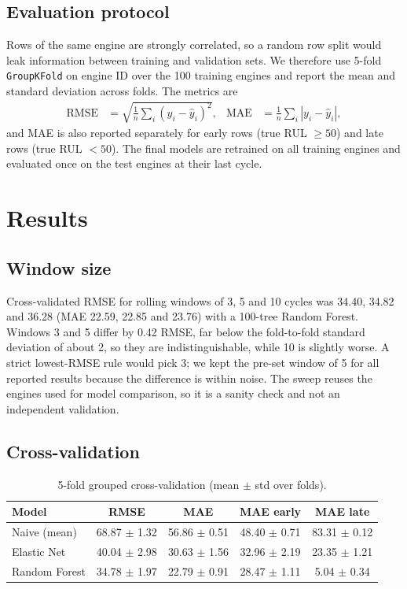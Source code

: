 \documentclass[conference]{IEEEtran}
\begin{document}
\subsection{Evaluation protocol}
Rows of the same engine are strongly correlated, so a random row split would leak information between training and validation sets. We therefore use 5-fold \texttt{GroupKFold} on engine ID over the 100 training engines and report the mean and standard deviation across folds. The metrics are
\begin{align}
\mathrm{RMSE} &= \sqrt{\tfrac{1}{n}\textstyle\sum_i (y_i-\hat y_i)^2}, &
\mathrm{MAE} &= \tfrac{1}{n}\textstyle\sum_i |y_i-\hat y_i|,
\end{align}
and MAE is also reported separately for early rows (true RUL $\ge 50$) and late rows (true RUL $<50$). The final models are retrained on all training engines and evaluated once on the test engines at their last cycle.

\section{Results}
\subsection{Window size}
Cross-validated RMSE for rolling windows of 3, 5 and 10 cycles was 34.40, 34.82 and 36.28 (MAE 22.59, 22.85 and 23.76) with a 100-tree Random Forest. Windows 3 and 5 differ by 0.42 RMSE, far below the fold-to-fold standard deviation of about 2, so they are indistinguishable, while 10 is slightly worse. A strict lowest-RMSE rule would pick 3; we kept the pre-set window of 5 for all reported results because the difference is within noise. The sweep reuses the engines used for model comparison, so it is a sanity check and not an independent validation.

\subsection{Cross-validation}
\begin{table}[t]
\centering
\caption{5-fold grouped cross-validation (mean $\pm$ std over folds).}
\label{tab:cv}
\begin{tabular}{lcccc}
\toprule
Model & RMSE & MAE & MAE early & MAE late \\
\midrule
Naive (mean) & 68.87 $\pm$ 1.32 & 56.86 $\pm$ 0.51 & 48.40 $\pm$ 0.71 & 83.31 $\pm$ 0.12 \\
Elastic Net & 40.04 $\pm$ 2.98 & 30.63 $\pm$ 1.56 & 32.96 $\pm$ 2.19 & 23.35 $\pm$ 1.21 \\
Random Forest & 34.78 $\pm$ 1.97 & 22.79 $\pm$ 0.91 & 28.47 $\pm$ 1.11 & 5.04 $\pm$ 0.34 \\
\bottomrule
\end{tabular}
\end{table}
\end{document}
